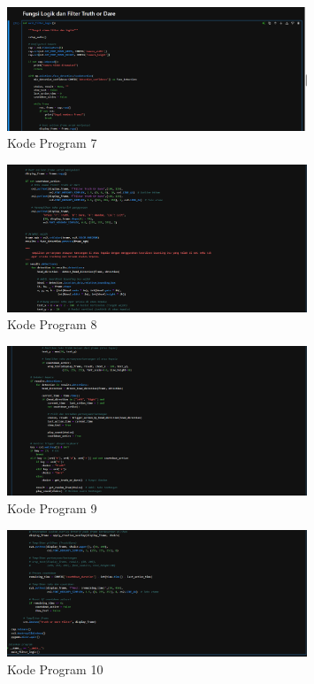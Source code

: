 \documentclass[11pt,a4paper]{article}
\begin{document}
\begin{figure}[H]
    \centering
    \includegraphics[width=0.8\textwidth]{7.png} %
    \caption{Kode Program 7}
    \label{fig:7}
\end{figure}

\begin{figure}[H]
    \centering
    \includegraphics[width=0.8\textwidth]{8.png} %
    \caption{Kode Program 8}
    \label{fig:8}
\end{figure}

\begin{figure}[H]
    \centering
    \includegraphics[width=0.8\textwidth]{9.png} %
    \caption{Kode Program 9}
    \label{fig:9}
\end{figure}

\begin{figure}[H]
    \centering
    \includegraphics[width=0.8\textwidth]{10.png} %
    \caption{Kode Program 10}
    \label{fig:10}
\end{figure}
\end{document}
